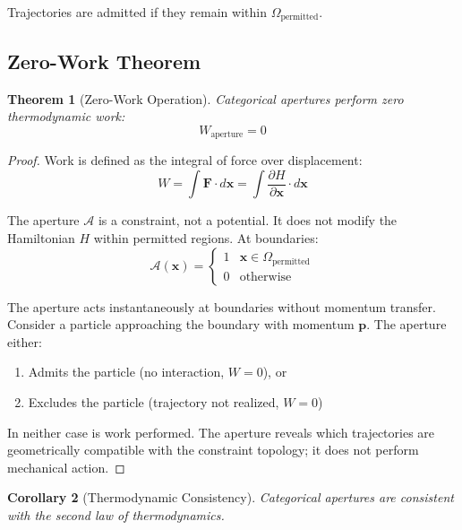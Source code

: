 \documentclass[twocolumn,amsmath,amssymb,aps,prl,superscriptaddress]{revtex4-2}
\newtheorem{theorem}{Theorem}[section]
\newtheorem{corollary}[theorem]{Corollary}
\newcommand{\Apert}{\mathcal{A}}
\newcommand{\Wapert}{W_{\text{aperture}}}
\begin{document}
Trajectories are admitted if they remain within $\Omega_{\text{permitted}}$.

\subsection{Zero-Work Theorem}

\begin{theorem}[Zero-Work Operation]
\label{thm:zerowork}
Categorical apertures perform zero thermodynamic work:
\begin{equation}
\boxed{\Wapert = 0}
\end{equation}
\end{theorem}

\begin{proof}
Work is defined as the integral of force over displacement:
\begin{equation}
W = \int \mathbf{F} \cdot d\mathbf{x} = \int \frac{\partial H}{\partial \mathbf{x}} \cdot d\mathbf{x}
\end{equation}

The aperture $\Apert$ is a constraint, not a potential. It does not modify the Hamiltonian $H$ within permitted regions. At boundaries:
\begin{equation}
\Apert(\mathbf{x}) = \begin{cases} 1 & \mathbf{x} \in \Omega_{\text{permitted}} \\ 0 & \text{otherwise} \end{cases}
\end{equation}

The aperture acts instantaneously at boundaries without momentum transfer. Consider a particle approaching the boundary with momentum $\mathbf{p}$. The aperture either:
\begin{enumerate}
\item Admits the particle (no interaction, $W = 0$), or
\item Excludes the particle (trajectory not realized, $W = 0$)
\end{enumerate}

In neither case is work performed. The aperture reveals which trajectories are geometrically compatible with the constraint topology; it does not perform mechanical action.
\end{proof}

\begin{corollary}[Thermodynamic Consistency]
Categorical apertures are consistent with the second law of thermodynamics.
\end{corollary}
\end{document}
